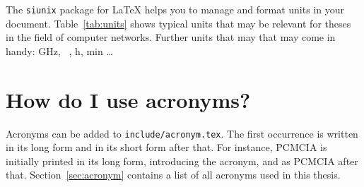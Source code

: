 The \texttt{siunix} package for \LaTeX{} helps you to manage and format units in your document.
Table~\ref{tab:units} shows typical units that may be relevant for theses in the field of computer networks.
Further units that may that may come in handy: \si{\giga\hertz}, \si{\mebi\byte}, \si{\hour}, \si{\minute} \ldots

\section{How do I use acronyms?}

Acronyms can be added to \texttt{include/acronym.tex}.
The first occurrence is written in its long form and in its short form after that.
For instance, \ac{PCMCIA} is initially printed in its long form, introducing the acronym, and as \ac{PCMCIA} after that.
Section~\ref{sec:acronym} contains a list of all acronyms used in this thesis.
